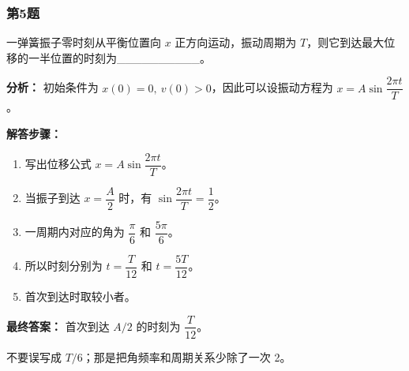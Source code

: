 \documentclass[12pt,a4paper]{ctexart}
\begin{document}
\subsubsection*{第5题}
\begin{tcolorbox}[colback=gray!2!white,colframe=black!60,title={题目}]
一弹簧振子零时刻从平衡位置向 \(x\) 正方向运动，振动周期为 \(T\)，则它到达最大位移的一半位置的时刻为\_\_\_\_\_\_\_\_\_\_。\par
\end{tcolorbox}
\begin{tcolorbox}[colback=blue!2!white,colframe=blue!55!black,title={完整答案}]
\textbf{分析：}
初始条件为 \(x(0)=0,\ v(0)>0\)，因此可以设振动方程为 \(x=A\sin\dfrac{2\pi t}{T}\)。\par
\textbf{解答步骤：}
\begin{enumerate}
\item 写出位移公式 \(x=A\sin\dfrac{2\pi t}{T}\)。
\item 当振子到达 \(x=\dfrac{A}{2}\) 时，有 \(\sin\dfrac{2\pi t}{T}=\dfrac12\)。
\item 一周期内对应的角为 \(\dfrac{\pi}{6}\) 和 \(\dfrac{5\pi}{6}\)。
\item 所以时刻分别为 \(t=\dfrac{T}{12}\) 和 \(t=\dfrac{5T}{12}\)。
\item 首次到达时取较小者。
\end{enumerate}
\textbf{最终答案：}
首次到达 \(A/2\) 的时刻为 \(\dfrac{T}{12}\)。\par
\end{tcolorbox}
\begin{tcolorbox}[colback=red!2!white,colframe=red!55!black,title={易错点}]
不要误写成 \(T/6\)；那是把角频率和周期关系少除了一次 2。\par
\end{tcolorbox}
\end{document}
